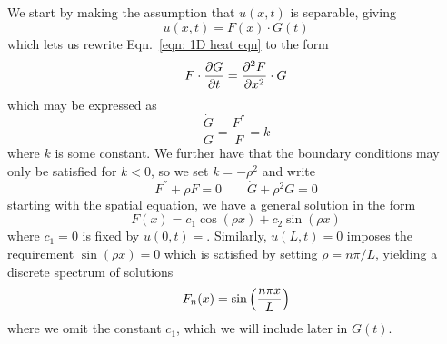 \documentclass[reprint, english, nofootinbib]{revtex4-2}
\begin{document}
We start by making the assumption that $u(x, t)$ is separable, giving 
\begin{equation}
    u(x, t) = F(x) \cdot G(t)
\end{equation}
which lets us rewrite Eqn.~\ref{eqn: 1D heat eqn} to the form
\begin{equation}
    F \cdot \pdv{G}{t} = \pdv[2]{F}{x} \cdot G
\end{equation}
which may be expressed as
\begin{equation}
    \frac{\dot G}{G} = \frac{F^{''}}{F} = k
\end{equation}
where $k$ is some constant. We further have that the boundary conditions may only be satisfied for $k <  0$, so we set $k = -\rho^2$ and write
\begin{equation}
    F^{''} + \rho F = 0 \quad \quad \dot G + \rho^2G = 0
\end{equation}
starting with the spatial equation, we have a general solution in the form 
\begin{equation}
    F(x) = c_1 \cos(\rho x) + c_2 \sin(\rho x)
\end{equation}
where $c_1 = 0$ is fixed by $u(0, t) = $. Similarly, $u(L, t) = 0$ imposes the requirement $\sin(\rho x) = 0$ which is satisfied by setting $\rho = n\pi/L$, yielding a discrete spectrum of solutions
\begin{equation}
    F_n(x) = \sin\qty(\frac{n\pi x}{L})
\end{equation}
where we omit the constant $c_1$, which we will include later in $G(t)$. 
\end{document}
